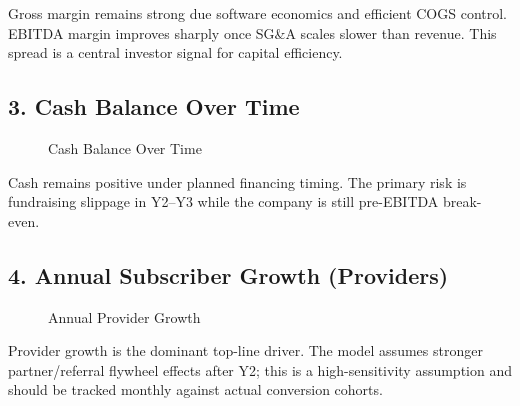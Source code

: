 \documentclass[11pt]{article}
\begin{document}
Gross margin remains strong due software economics and efficient COGS control. EBITDA margin improves sharply once SG\&A scales slower than revenue. This spread is a central investor signal for capital efficiency.

\subsection*{3. Cash Balance Over Time}
\begin{figure}[h]
\centering
{}
\caption{Cash Balance Over Time}
\end{figure}

Cash remains positive under planned financing timing. The primary risk is fundraising slippage in Y2--Y3 while the company is still pre-EBITDA break-even.

\subsection*{4. Annual Subscriber Growth (Providers)}
\begin{figure}[h]
\centering
{}
\caption{Annual Provider Growth}
\end{figure}

Provider growth is the dominant top-line driver. The model assumes stronger partner/referral flywheel effects after Y2; this is a high-sensitivity assumption and should be tracked monthly against actual conversion cohorts.
\end{document}
